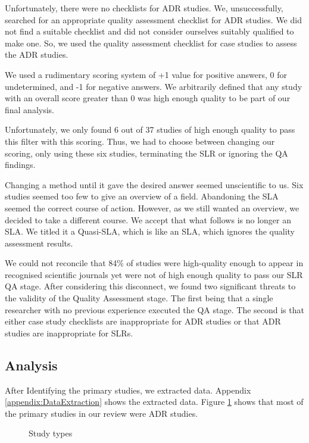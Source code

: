 Unfortunately, there were no checklists for ADR studies.
We, unsuccessfully, searched for an appropriate quality assessment checklist for ADR studies.
We did not find a suitable checklist and did not consider ourselves suitably qualified to make one.
So, we used the quality assessment checklist for case studies to assess the ADR studies.

We used a rudimentary scoring system of +1 value for positive answers, 0 for undetermined, and -1 for negative answers.
We arbitrarily defined that any study with an overall score greater than 0 was high enough quality to be part of our final analysis.

Unfortunately, we only found 6 out of 37 studies of high enough quality to pass this filter with this scoring.
Thus, we had to choose between changing our scoring, only using these six studies, terminating the SLR or ignoring the QA findings.

Changing a method until it gave the desired answer seemed unscientific to us.
Six studies seemed too few to give an overview of a field.
Abandoning the SLA seemed the correct course of action.
However, as we still wanted an overview, we decided to take a different course.
We accept that what follows is no longer an SLA. 
We titled it a Quasi-SLA, which is like an SLA, which ignores the quality assessment results.

We could not reconcile that 84\% of studies were high-quality enough to appear in recognised scientific journals yet were not of high enough quality to pass our SLR QA stage.
After considering this disconnect, we found two significant threats to the validity of the Quality Assessment stage.
The first being that a single researcher with no previous experience executed the QA stage.
The second is that either case study checklists are inappropriate for ADR studies or that ADR studies are inappropriate for SLRs.


\subsection{Analysis}
After Identifying the primary studies, we extracted data.
Appendix \ref{appendix:DataExtraction} shows the extracted data.
Figure \ref{fig:study_types} shows that most of the primary studies in our review were ADR studies.

\begin{figure}[h]
    \centering
    \caption{Study types}
    \label{fig:study_types}
\end{figure}

